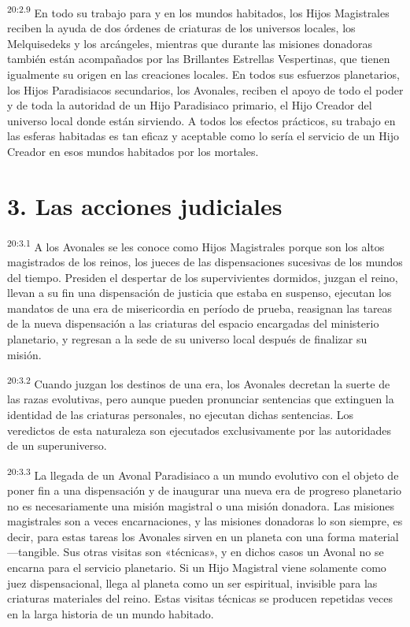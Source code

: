 \par
\textsuperscript{20:2.9} En todo su trabajo para y en los mundos habitados, los Hijos Magistrales reciben la ayuda de dos órdenes de criaturas de los universos locales, los Melquisedeks y los arcángeles, mientras que durante las misiones donadoras también están acompañados por las Brillantes Estrellas Vespertinas, que tienen igualmente su origen en las creaciones locales. En todos sus esfuerzos planetarios, los Hijos Paradisiacos secundarios, los Avonales, reciben el apoyo de todo el poder y de toda la autoridad de un Hijo Paradisiaco primario, el Hijo Creador del universo local donde están sirviendo. A todos los efectos prácticos, su trabajo en las esferas habitadas es tan eficaz y aceptable como lo sería el servicio de un Hijo Creador en esos mundos habitados por los mortales.

\section*{3. Las acciones judiciales}
\par
\textsuperscript{20:3.1} A los Avonales se les conoce como Hijos Magistrales porque son los altos magistrados de los reinos, los jueces de las dispensaciones sucesivas de los mundos del tiempo. Presiden el despertar de los supervivientes dormidos, juzgan el reino, llevan a su fin una dispensación de justicia que estaba en suspenso, ejecutan los mandatos de una era de misericordia en período de prueba, reasignan las tareas de la nueva dispensación a las criaturas del espacio encargadas del ministerio planetario, y regresan a la sede de su universo local después de finalizar su misión.

\par
\textsuperscript{20:3.2} Cuando juzgan los destinos de una era, los Avonales decretan la suerte de las razas evolutivas, pero aunque pueden pronunciar sentencias que extinguen la identidad de las criaturas personales, no ejecutan dichas sentencias. Los veredictos de esta naturaleza son ejecutados exclusivamente por las autoridades de un superuniverso.

\par
\textsuperscript{20:3.3} La llegada de un Avonal Paradisiaco a un mundo evolutivo con el objeto de poner fin a una dispensación y de inaugurar una nueva era de progreso planetario no es necesariamente una misión magistral o una misión donadora. Las misiones magistrales son a veces encarnaciones, y las misiones donadoras lo son siempre, es decir, para estas tareas los Avonales sirven en un planeta con una forma material ---tangible. Sus otras visitas son «técnicas», y en dichos casos un Avonal no se encarna para el servicio planetario. Si un Hijo Magistral viene solamente como juez dispensacional, llega al planeta como un ser espiritual, invisible para las criaturas materiales del reino. Estas visitas técnicas se producen repetidas veces en la larga historia de un mundo habitado.

